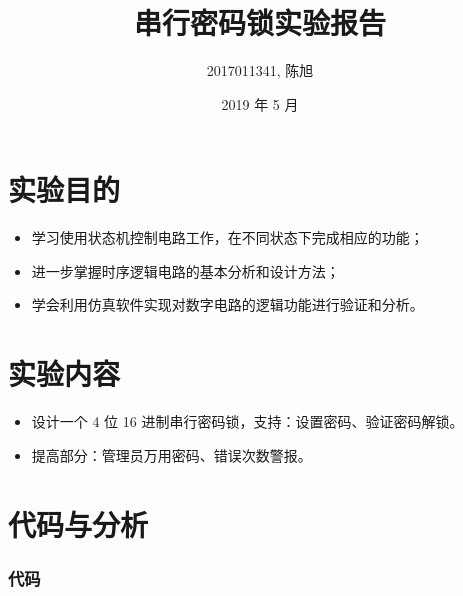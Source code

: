 \documentclass[a4paper]{article}
\title{串行密码锁实验报告}
\author{2017011341, 陈旭}
\date{2019 年 5 月}
\begin{document}
\maketitle

\section{实验目的}

    \begin{itemize}
        \item 学习使用状态机控制电路工作，在不同状态下完成相应的功能；
        \item 进一步掌握时序逻辑电路的基本分析和设计方法；
        \item 学会利用仿真软件实现对数字电路的逻辑功能进行验证和分析。
    \end{itemize}

\section{实验内容}

    \begin{itemize}
        \item 设计一个 4 位 16 进制串行密码锁，支持：设置密码、验证密码解锁。
        \item 提高部分：管理员万用密码、错误次数警报。
    \end{itemize}

\section{代码与分析}

    \subsubsection{代码}
\end{document}
